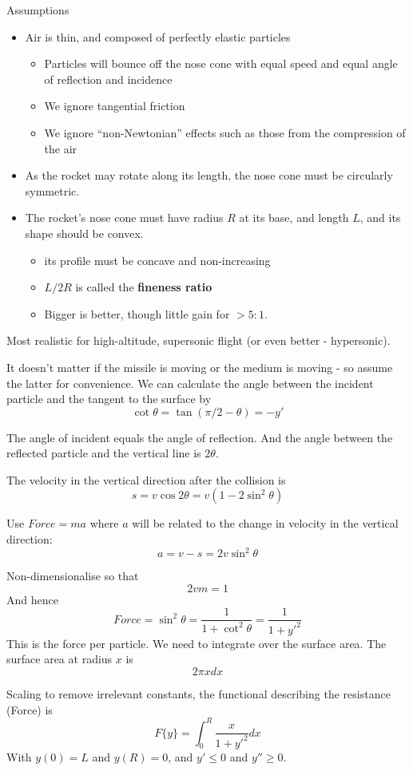 \documentclass{X:/Documents/Coding/Latex/myassignment}
\begin{document}
Assumptions
\begin{itemize}
	\item Air is thin, and composed of perfectly elastic particles
\begin{itemize}	
	\item Particles will bounce off the nose cone with equal speed and equal angle of reflection and incidence
	\item We ignore tangential friction
	\item We ignore ``non-Newtonian'' effects such as those from the compression of the air
\end{itemize}
	\item As the rocket may rotate along its length, the nose cone must be circularly symmetric.
	\item The rocket's nose cone must have radius $R$ at its base, and length $L$, and its shape should be convex.
	\begin{itemize}
		\item its profile must be concave and non-increasing
		\item $L/2R$ is called the \textbf{fineness ratio}
		\item Bigger is better, though little gain for $> 5:1$.
	\end{itemize}
\end{itemize}
Most realistic for high-altitude, supersonic flight (or even better - hypersonic).

It doesn't matter if the missile is moving or the medium is moving - so assume the latter for convenience. We can calculate the angle between the incident particle and the tangent to the surface by
\[\cot\theta = \tan(\pi/2 - \theta) = -y'\]

The angle of incident equals the angle of reflection. And the angle between the reflected particle and the vertical line is $2\theta$.

The velocity in the vertical direction after the collision is
\[s = v\cos 2\theta = v(1- 2 \sin^2\theta)\]

Use $Force = ma$ where $a$ will be related to the change in velocity in the vertical direction:
\[a = v-s = 2v\sin^2\theta\]

Non-dimensionalise so that
\[2vm = 1\]
And hence
\[Force = \sin^2\theta = \frac{1}{1+\cot^2\theta} = \frac{1}{1+y'^2}\]
This is the force per particle. We need to integrate over the surface area.
The surface area at radius $x$ is 
\[2\pi x dx\]

Scaling to remove irrelevant constants, the functional describing the resistance (Force)
is
\[F\{y\} = \int_0^R \frac{x}{1+y'^2} dx\]
With $y(0) = L$ and $y(R) = 0$, and $y' \leq 0$ and $y'' \geq 0$.
\end{document}
